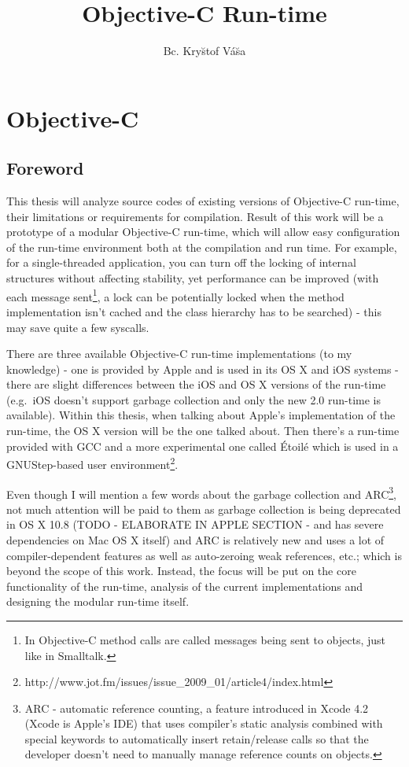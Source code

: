 \documentclass[a4paper, 11pt, fleqn]{book}
\begin{document}
\title{Objective-C Run-time}
\author{Bc. Kry\u{s}tof V\'{a}\u{s}a}
\date{}
\maketitle 

\tableofcontents

\chapter{Objective-C}
\section{Foreword}

This thesis will analyze source codes of existing versions of Objective-C run-time, their limitations or requirements for compilation. Result of this work will be a prototype of a modular Objective-C run-time, which will allow easy configuration of the run-time environment both at the compilation and run time. For example, for a single-threaded application, you can turn off the locking of internal structures without affecting stability, yet performance can be improved (with each message sent\footnote{In Objective-C method calls are called messages being sent to objects, just like in Smalltalk.}, a lock can be potentially locked when the method implementation isn't cached and the class hierarchy has to be searched) - this may save quite a few syscalls.

There are three available Objective-C run-time implementations (to my knowledge) - one is provided by Apple and is used in its OS X and iOS systems - there are slight differences between the iOS and OS X versions of the run-time (e.g.\ iOS doesn't support garbage collection and only the new 2.0 run-time is available). Within this thesis, when talking about Apple's implementation of the run-time, the OS X version will be the one talked about. Then there's a run-time provided with GCC and a more experimental one called \'{E}toil\'{e} which is used in a GNUStep-based user environment\footnote{http://www.jot.fm/issues/issue\_2009\_01/article4/index.html}.

Even though I will mention a few words about the garbage collection and ARC\footnote{ARC - automatic reference counting, a feature introduced in Xcode 4.2 (Xcode is Apple's IDE) that uses compiler's static analysis combined with special keywords to automatically insert retain/release calls so that the developer doesn't need to manually manage reference counts on objects.}, not much attention will be paid to them as garbage collection is being deprecated in OS X 10.8 (TODO - ELABORATE IN APPLE SECTION - and has severe dependencies on Mac OS X itself) and ARC is relatively new and uses a lot of compiler-dependent features as well as auto-zeroing weak references, etc.; which is beyond the scope of this work. Instead, the focus will be put on the core functionality of the run-time, analysis of the current implementations and designing the modular run-time itself.
  
\end{document}
